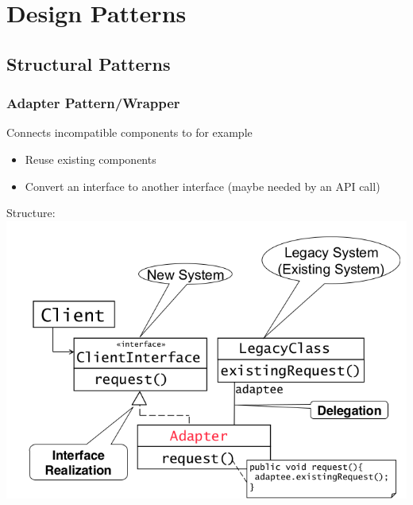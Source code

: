 
\section{Design Patterns}


\subsection{Structural Patterns}

\subsubsection{Adapter Pattern/Wrapper}
Connects incompatible components to for example
\begin{itemize}
  \item Reuse existing components
  \item Convert an interface to another interface (maybe needed by an API call)
\end{itemize}

Structure:\\
\includegraphics[width=\linewidth]{images/pattern_adapter.png}
\newpage

